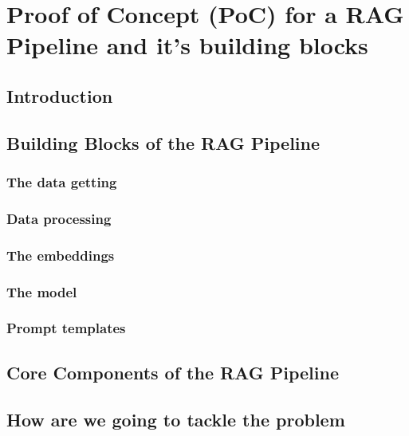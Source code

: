 \chapter{Proof of Concept (PoC) for a RAG Pipeline and it's building blocks}

\section{Introduction}

\section{Building Blocks of the RAG Pipeline}
    \subsection{The data getting}
    \subsection{Data processing}
    \subsection{The embeddings}
    \subsection{The model}
    \subsection{Prompt templates}
\section{Core Components of the RAG Pipeline}
\section{How are we going to tackle the problem}
